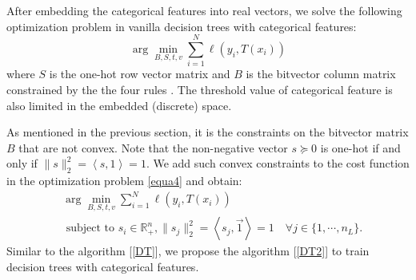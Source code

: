 \documentclass[UTF8]{article}
\begin{document}

After embedding the categorical features into real vectors,
we solve the following optimization problem in vanilla decision trees with categorical features:
$$\arg\min_{B, S, t, v}\sum_{i=1}^{N}\ell(y_i, T(x_i))$$
where $S$ is the one-hot row vector  matrix and
$B$ is the bitvector column matrix constrained by the the four rules .
The threshold value of categorical feature is also limited in the embedded (discrete) space.

As mentioned in the previous section, it is the constraints on the bitvector matrix $B$
that are not convex.
Note that the non-negative vector $s\succeq 0$ is one-hot if and only
if $\|s\|_2^2=\left<s, \mathrm{1}\right>=1$.
We add such convex constraints to the cost function in the optimization problem \eqref{equa4} and obtain:
\begin{equation}\label{opt2}
\begin{split}
&\arg\min_{B, S, t,v}\sum_{i=1}^{N}\ell(y_i, T(x_i))\\
&\text{ subject to }s_i\in\mathbb{R}_{+}^{n},\|s_j\|_{2}^2=\left<s_j, \vec{1}\right>=1\quad \forall j\in\{1,\cdots,n_L\}.
\end{split}
\end{equation}
Similar to the algorithm [\ref{DT}], we propose the algorithm [\ref{DT2}]
to train decision trees with categorical features.


\end{document}
